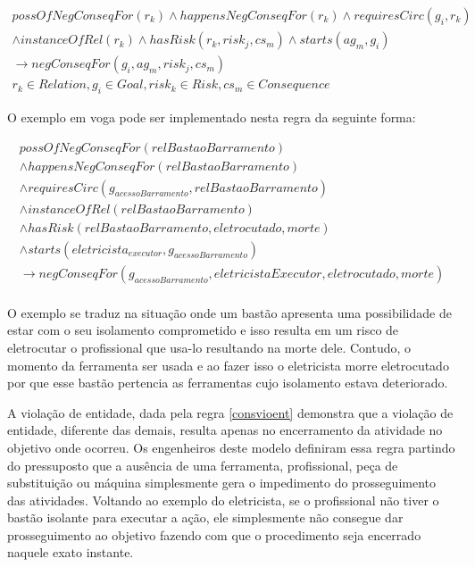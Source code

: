 \begin{eqnarray}\label{paybutiamnotguilty}
	possOfNegConseqFor(r_k) \wedge  happensNegConseqFor(r_k) \wedge requiresCirc(g_i,r_k) \nonumber \\ 
	\wedge instanceOfRel(r_k) \wedge hasRisk(r_k,risk_j,cs_m) \wedge starts(ag_m,g_i) \nonumber \\ 
	\to negConseqFor(g_i,ag_m,risk_j,cs_m) \nonumber \\ 
    r_k \in Relation, g_i \in Goal, risk_k \in Risk, cs_m \in Consequence
\end{eqnarray}

O exemplo em voga pode ser implementado nesta regra da seguinte forma: 


\begin{eqnarray}\nonumber
   possOfNegConseqFor(relBastaoBarramento) \nonumber \\
    \wedge happensNegConseqFor(relBastaoBarramento) \nonumber \\ 
    \wedge requiresCirc(g_{acessoBarramento},relBastaoBarramento) \nonumber \\  
    \wedge instanceOfRel(relBastaoBarramento) \nonumber \\ 
    \wedge hasRisk(relBastaoBarramento,eletrocutado,morte) \nonumber \\  
    \wedge starts(eletricista_{executor},g_{acessoBarramento}) \nonumber \\ 
    \to negConseqFor(g_{acessoBarramento},eletricistaExecutor,eletrocutado,morte) \\ \nonumber
\end{eqnarray}

O exemplo se traduz na situação onde um bastão apresenta uma possibilidade de estar com o seu isolamento comprometido e isso resulta em um risco de eletrocutar o profissional que usa-lo resultando na morte dele. Contudo, o momento da ferramenta ser usada e ao fazer isso o eletricista morre eletrocutado por que esse bastão pertencia as ferramentas cujo isolamento estava deteriorado. 

A violação de entidade, dada pela regra \ref{consvioent} demonstra que a violação de entidade, diferente das demais, resulta apenas no encerramento da atividade no objetivo onde ocorreu. Os engenheiros deste modelo definiram essa regra partindo do pressuposto que a ausência de uma ferramenta, profissional, peça de substituição ou máquina simplesmente gera o impedimento do prosseguimento das atividades. Voltando ao exemplo do eletricista, se o profissional não tiver o bastão isolante para executar a ação, ele simplesmente não consegue dar prosseguimento ao objetivo fazendo com que o procedimento seja encerrado naquele exato instante. 

